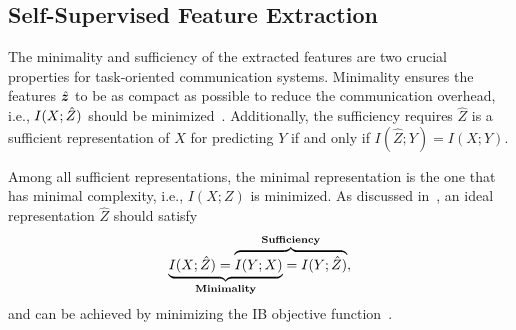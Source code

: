 \subsection{Self-Supervised Feature Extraction}
\label{sec:method:multi-view}

The minimality and sufficiency of the extracted features are two crucial properties for task-oriented communication systems.
Minimality ensures the features $\hat{\boldsymbol{z}}$ to be as compact as possible to reduce the communication overhead, i.e., $I(X;\hat{Z})$ should be minimized~\cite{vfe, li2024tackling}. Additionally, the sufficiency requires $\hat{Z}$ is a sufficient representation of $X$ for predicting $Y$ if and only if $I(\hat{Z};Y)=I(X;Y)$.

Among all sufficient representations, the minimal representation is the one that has minimal complexity, i.e., $I(X;Z)$ is minimized. As discussed in~\cite{shao2023task, alemi2016deepVIB,e22090999_ceb}, an ideal representation $\hat{Z}$ should satisfy
\begin{equation}
    \begin{aligned}
        \label{eq:ideal}
        \rlap{$\underbrace{\phantom{{I(X ; \hat{Z}) =I(Y;X)}}}_{\textbf{Minimality}}$} I(X ; \hat{Z}) = \overbrace{I(Y;X) =I(Y ; \hat{Z})}^{\textbf{Sufficiency}},
    \end{aligned}
\end{equation}
and can be achieved by minimizing the IB objective function~\cite{vfe, li2024tackling}.


